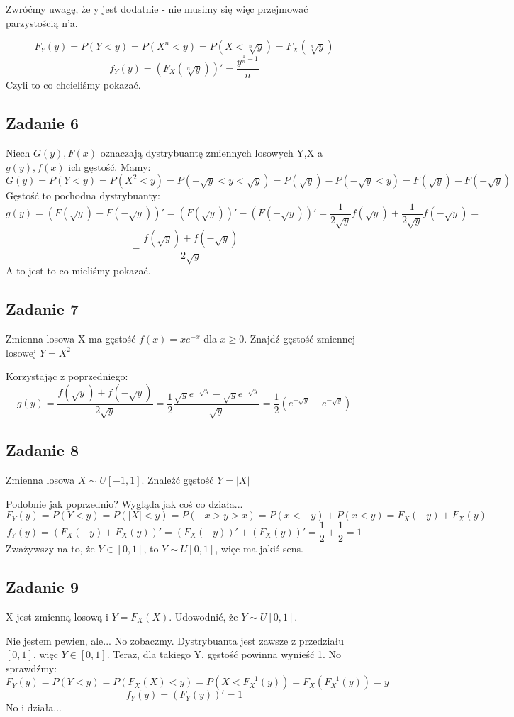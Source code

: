 \documentclass[a4paper]{article}
\begin{document}
\begin{enumerate}[(a)]
Zwróćmy uwagę, że y jest dodatnie - nie musimy się więc przejmować parzystością n'a.

$$F_Y(y)=P(Y<y)=P(X^n<y)=P(X<\sqrt[n]{y})=F_X(\sqrt[n]{y})$$
$$f_Y(y)=(F_X(\sqrt[n]{y}))'= \frac{y^{\frac{1}{n}-1}}{n}$$
Czyli to co chcieliśmy pokazać.
 
\subsection*{Zadanie 6}
Niech $G(y), F(x)$ oznaczają dystrybuantę zmiennych losowych Y,X a $g(y),f(x)$ ich gęstość. Mamy:
$$G(y)=P(Y<y)=P(X^2<y)=P(-\sqrt{y}<y<\sqrt{y})=P(\sqrt{y}) - P(-\sqrt{y}<y)=F(\sqrt{y})-F(-\sqrt{y})$$
Gęstość to pochodna dystrybuanty:
$$g(y)=\left(F(\sqrt{y})-F(-\sqrt{y})\right)'=\left(F(\sqrt{y})\right)'-\left(F(-\sqrt{y})\right)'=\frac{1}{2\sqrt{y}}f(\sqrt{y})+\frac{1}{2\sqrt{y}}f(-\sqrt{y})=$$
$$=\frac{f(\sqrt{y}) + f(-\sqrt{y})}{2\sqrt{y}} $$
A to jest to co mieliśmy pokazać. 
 
\subsection*{Zadanie 7}
Zmienna losowa X ma gęstość $f(x)=xe^{-x}$ dla $x\geq 0$. Znajdź gęstość zmiennej losowej $Y=X^2$

Korzystając z poprzedniego:
$$g(y)=\frac{f(\sqrt{y}) + f(-\sqrt{y})}{2\sqrt{y}}= \frac{1}{2}\frac{\sqrt{y}e^{-\sqrt{y}} - \sqrt{y}e^{-\sqrt{y}}}{\sqrt{y}}=\frac{1}{2}\left(e^{-\sqrt{y}} - e^{-\sqrt{y}} \right)$$
\end{enumerate}

\subsection*{Zadanie 8}
Zmienna losowa $X \sim U[-1,1]$. Znaleźć gęstość $Y=|X|$

Podobnie jak poprzednio? Wygląda jak coś co działa...
$$F_Y(y)=P(Y<y)=P(|X|<y)=P(-x>y>x)=P(x<-y)+P(x<y)=F_X(-y)+F_X(y)$$
$$f_Y(y)=(F_X(-y)+F_X(y))'=(F_X(-y))'+(F_X(y))'=\frac{1}{2}+\frac{1}{2} = 1$$ Zważywszy na to, że $Y\in [0,1]$, to $Y\sim U[0,1]$, więc ma jakiś sens.

\subsection*{Zadanie 9}
X jest zmienną losową i $Y=F_X(X)$. Udowodnić, że $Y \sim U[0,1]$.

Nie jestem pewien, ale... No zobaczmy. Dystrybuanta jest zawsze z przedziału $[0,1]$, więc $Y\in [0,1]$. Teraz, dla takiego Y, gęstość powinna wynieść 1. No sprawdźmy:\\
$$F_Y(y)=P(Y<y)=P(F_X(X)<y)=P(X<F^{-1}_X(y))=F_X(F_X^{-1}(y))=y$$
$$f_Y(y)=(F_Y(y))'=1$$
No i działa...
\end{document}
